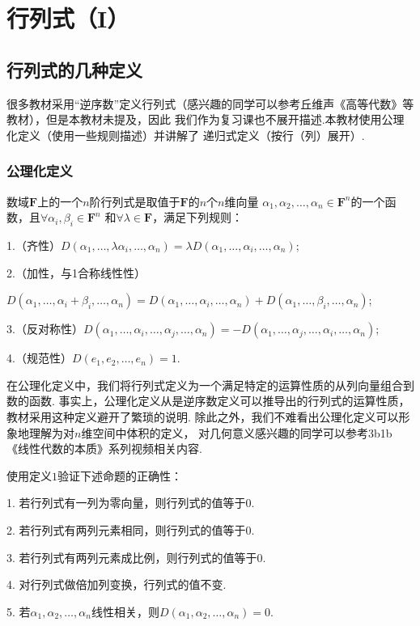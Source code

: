 \chapter{行列式（I）}

\section{行列式的几种定义}
很多教材采用“逆序数”定义行列式（感兴趣的同学可以参考丘维声《高等代数》等教材），但是本教材未提及，因此
我们作为复习课也不展开描述.本教材使用公理化定义（使用一些规则描述）并讲解了
递归式定义（按行（列）展开）.

\subsection{公理化定义}
\begin{definition}
	数域$\mathbf{F}$上的一个$n$阶行列式是取值于$\mathbf{F}$的$n$个$n$维向量
	$\alpha_1,\alpha_2,\dots,\alpha_n \in \mathbf{F}^n$的一个函数，且$\forall \alpha_i,\beta_i \in \mathbf{F}^n$
	和$\forall \lambda \in \mathbf{F}$，满足下列规则：
	
	\textup{1}.（齐性）$D(\alpha_1,\dots,\lambda\alpha_i,\dots,\alpha_n)=\lambda D(\alpha_1,\dots,\alpha_i,\dots,\alpha_n)$\textup{;}

	\textup{2}.（加性，与\textup{1}合称线性性）
	
	$D(\alpha_1,\dots,\alpha_i+\beta_i,\dots,\alpha_n)=D(\alpha_1,\dots,\alpha_i,\dots,\alpha_n)+D(\alpha_1,\dots,\beta_i,\dots,\alpha_n)$\textup{;}

	\textup{3}.（反对称性）$D(\alpha_1,\dots,\alpha_i,\dots,\alpha_j,\dots,\alpha_n)=-D(\alpha_1,\dots,\alpha_j,\dots,\alpha_i,\dots,\alpha_n)$\textup{;}

	\textup{4}.（规范性）$D(e_1,e_2,\dots,e_n)=1$.
\end{definition}
在公理化定义中，我们将行列式定义为一个满足特定的运算性质的从列向量组合到数的函数.
事实上，公理化定义从是逆序数定义可以推导出的行列式的运算性质，教材采用这种定义避开了繁琐的说明.
除此之外，我们不难看出公理化定义可以形象地理解为对$n$维空间中体积的定义，
对几何意义感兴趣的同学可以参考3b1b《线性代数的本质》系列视频相关内容.
\begin{example}
	使用定义$1$验证下述命题的正确性：

	\textup{1}. 若行列式有一列为零向量，则行列式的值等于$0$.

	\textup{2}. 若行列式有两列元素相同，则行列式的值等于$0$.

	\textup{3}. 若行列式有两列元素成比例，则行列式的值等于$0$.

	\textup{4}. 对行列式做倍加列变换，行列式的值不变.

	\textup{5}. 若$\alpha_1,\alpha_2,\dots,\alpha_n$线性相关，则$D(\alpha_1,\alpha_2,\dots,\alpha_n)=0$.
\end{example}

